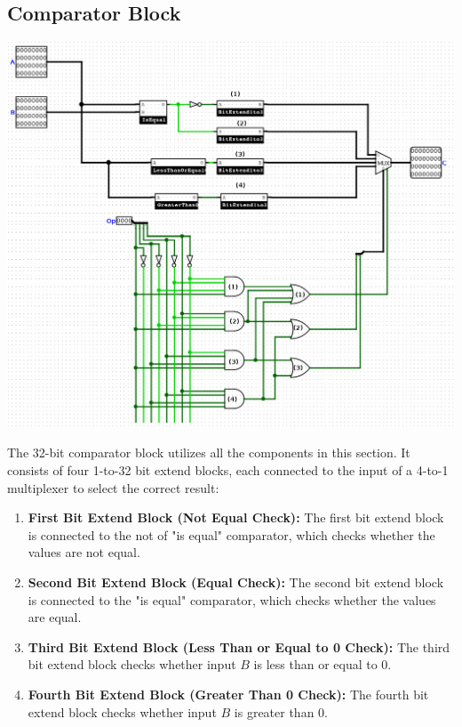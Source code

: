\documentclass{article}
\begin{document}
\subsection{Comparator Block}
\begin{center}
    \includegraphics[width=1\textwidth]{images/Comparator32Upgraded.png}
\end{center}
\noindent The 32-bit comparator block utilizes all the components in this section. It consists of four 1-to-32 bit extend blocks, each connected to the input of a 4-to-1 multiplexer to select the correct result:

\begin{enumerate}
    \item \textbf{First Bit Extend Block (Not Equal Check):}  
    The first bit extend block is connected to the not of "is equal" comparator, which checks whether the values are not equal.
    
    \item \textbf{Second Bit Extend Block (Equal Check):}  
    The second bit extend block is connected to the "is equal" comparator, which checks whether the values are equal.
    
    \item \textbf{Third Bit Extend Block (Less Than or Equal to 0 Check):}  
    The third bit extend block checks whether input \( B \) is less than or equal to 0.
    
    \item \textbf{Fourth Bit Extend Block (Greater Than 0 Check):}  
    The fourth bit extend block checks whether input \( B \) is greater than 0.
\end{enumerate}
\end{document}
